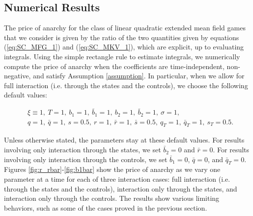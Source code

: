 \documentclass[11pt]{article}
\begin{document}
\subsection{\textbf{Numerical Results}}
The price of anarchy for the class of linear quadratic extended mean field games that we consider is given by the ratio of the two quantities given by equations (\ref{eq:SC_MFG_1}) and (\ref{eq:SC_MKV_1}), which are explicit, up to evaluating integrals. Using the simple rectangle rule to estimate integrals, we numerically compute the price of anarchy when the coefficients are time-independent, non-negative, and satisfy Assumption \ref{assumption}. In particular, when we allow for full interaction (i.e. through the states and the controls), we choose the following default values:

\begin{equation*}
\begin{split}
    &\xi\equiv 1,\ T=1,\ b_1=1,\  \bar{b}_1=1,\ b_2=1,\ \bar{b}_2=1,\ \sigma=1, \\
    &q=1,\ \bar{q}=1,\ s=0.5,\ r=1,\ \bar{r}=1,\ \bar{s}=0.5,\ q_T=1,\  \bar{q}_T=1,\ s_T=0.5.
\end{split}
\end{equation*}

Unless otherwise stated, the parameters stay at these default values. For results involving only interaction through the states, we set $\bar{b}_2=0$ and $\bar{r}=0$. For results involving only interaction through the controls, we set $\bar{b}_1=0$, $\bar{q}=0$, and $\bar{q}_T=0$. Figures \ref{fig:r_rbar}-\ref{fig:b1bar} show the price of anarchy as we vary one parameter at a time for each of three interaction cases: full interaction (i.e. through the states and the controls), interaction only through the states, and interaction only through the controls. The results show various limiting behaviors, such as some of the cases proved in the previous section.
\end{document}

